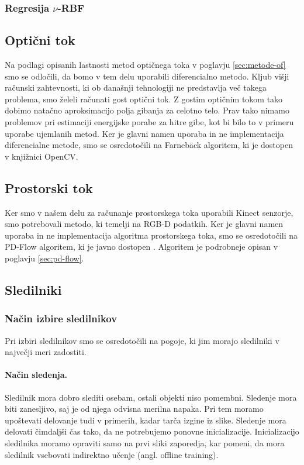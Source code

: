 \subsubsection{Regresija \texorpdfstring{$\nu$}{nu}-RBF}





\subsection{Optični tok}
Na podlagi opisanih lastnosti metod optičnega toka v poglavju \ref{sec:metode-of} smo se odločili, da bomo v tem delu uporabili diferencialno metodo. Kljub višji računski zahtevnosti, ki ob današnji tehnologiji ne predstavlja več takega problema, smo želeli računati gost optični tok. Z gostim optičnim tokom tako dobimo natačno aproksimacijo polja gibanja za celotno telo. Prav tako nimamo problemov pri estimaciji energijske porabe za hitre gibe, kot bi bilo to v primeru uporabe ujemlanih metod. Ker je glavni namen uporaba in ne implementacija diferencialne metode, smo se osredotočili na Farneb{\"a}ck algoritem, ki je dostopen v knjižnici OpenCV.


\subsection{Prostorski tok}
Ker smo v našem delu za računanje prostorskega toka uporabili Kinect senzorje, smo potrebovali metodo, ki temelji na RGB-D podatkih. Ker je glavni namen uporaba in ne implementacija algoritma prostorskega toka, smo se osredotočili na PD-Flow algoritem, ki je javno dostopen \cite{jaimez2015primal}. Algoritem je podrobneje opisan v poglavju \ref{sec:pd-flow}.





\subsection{Sledilniki}
\subsubsection{Način izbire sledilnikov}\label{sec:pogoji-sledilnikov}
Pri izbiri sledilnikov smo se osredotočili na pogoje, ki jim morajo sledilniki v največji meri zadostiti.

\paragraph{Način sledenja.} Sledilnik mora dobro slediti osebam, ostali objekti niso pomembni. Sledenje mora biti zanesljivo, saj je od njega odvisna merilna napaka. Pri tem moramo upoštevati delovanje tudi v primerih, kadar tarča izgine iz slike. Sledenje mora delovati čimdaljši čas tako, da ne potrebujemo ponovne inicializacije. Inicializacijo sledilnika moramo opraviti samo na prvi sliki zaporedja, kar pomeni, da mora sledilnik vsebovati indirektno učenje (angl. offline training).

